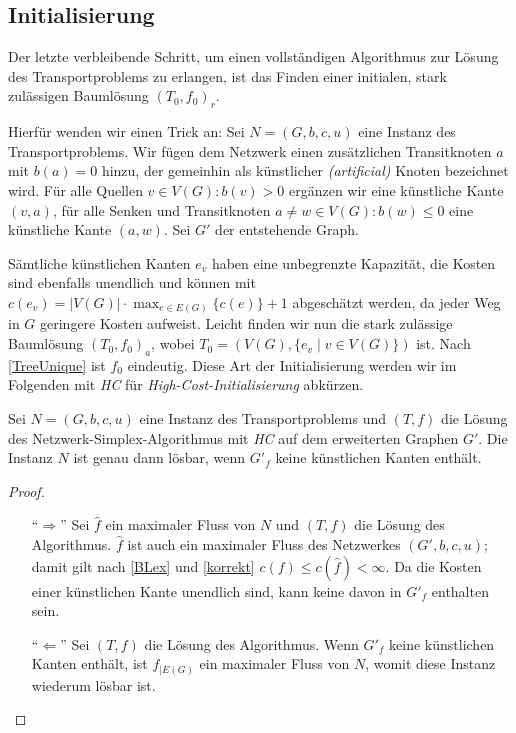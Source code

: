 \subsection{Initialisierung} \label{ch:init}
Der letzte verbleibende Schritt, um einen vollständigen Algorithmus zur Lösung des Transportproblems zu erlangen, ist das Finden einer initialen, stark zulässigen Baumlösung $(T_0,f_0)_r$.

Hierfür wenden wir einen Trick an: Sei $N=(G,b,c,u)$ eine Instanz des Transportproblems. Wir fügen dem Netzwerk einen zusätzlichen Transitknoten $a$ mit $b(a)=0$ hinzu, der gemeinhin als künstlicher \textit{(artificial)} Knoten bezeichnet wird. Für alle Quellen $v\in V(G)\colon b(v)>0$ ergänzen wir eine künstliche Kante $(v,a)$, für alle Senken und Transitknoten $a\neq w\in V(G)\colon b(w)\leq0$ eine künstliche Kante $(a,w)$. Sei $G'$ der entstehende Graph.

Sämtliche künstlichen Kanten $e_v$ haben eine unbegrenzte Kapazität, die Kosten sind ebenfalls unendlich und können mit $c(e_v)=|V(G)|\cdot\max_{e\in E(G)}\{c(e)\}+1$ abgeschätzt werden, da jeder Weg in $G$ geringere Kosten aufweist. Leicht finden wir nun die stark zulässige Baumlösung $(T_0,f_0)_a$, wobei $T_0=(V(G),\{e_v\mid v\in V(G)\})$ ist. Nach \cref{TreeUnique} ist $f_0$ eindeutig. Diese Art der Initialisierung werden wir im Folgenden mit \emph{HC} für \emph{High-Cost-Initialisierung} abkürzen.

\begin{lem}Sei $N=(G,b,c,u)$ eine Instanz des Transportproblems und $(T,f)$ die Lösung des Netzwerk-Simplex-Algorithmus mit \emph{HC} auf dem erweiterten Graphen $G'$. Die Instanz $N$ ist genau dann lösbar, wenn $G'_f$ keine künstlichen Kanten enthält.\end{lem}
\begin{proof}\label{solvable}\mbox{}
\begin{itemize}[topsep=0pt]
	\item[\enquote{$\Rightarrow$}] Sei $\hat{f}$ ein maximaler Fluss von $N$ und $(T,f)$ die Lösung des Algorithmus. $\hat{f}$ ist auch ein maximaler Fluss des Netzwerkes $(G',b,c,u)$; damit gilt nach \cref{BLex} und \cref{korrekt} $c(f)\leq c(\hat{f})<\infty$. Da die Kosten einer künstlichen Kante unendlich sind, kann keine davon in $G'_f$ enthalten sein.
	
	\item[\enquote{$\Leftarrow$}] Sei $(T,f)$ die Lösung des Algorithmus. Wenn $G'_f$ keine künstlichen Kanten enthält, ist $f_{|E(G)}$ ein maximaler Fluss von $N$, womit diese Instanz wiederum lösbar ist.\qedhere
\end{itemize}
\end{proof}

